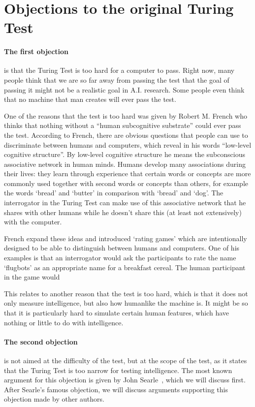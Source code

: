\section{Objections to the original Turing Test}

\cite{sep-turing-test,another}
\paragraph{The first objection} is that the Turing Test is too hard for a computer to pass. Right now, many people think that we are so far away from passing the test that the goal of passing it might not be a realistic goal in A.I. research. Some people even think that no machine that man creates will ever pass the test.

One of the reasons that the test is too hard was given by Robert M. French who thinks that nothing without a “human subcognitive substrate” could ever pass the test. According to French, there are obvious questions that people can use to discriminate between humans and computers, which reveal in his words “low-level cognitive structure”. By low-level cognitive structure he means the subconscious associative network in human minds. Humans develop many associations during their lives: they learn through experience that certain words or concepts are more commonly used together with second words or concepts than others, for example the words ‘bread’ and ‘butter’ in comparison with ‘bread’ and ‘dog’. The interrogator in the Turing Test can make use of this associative network that he shares with other humans while he doesn’t share this (at least not extensively) with the computer.

French expand these ideas and introduced ‘rating games’ which are intentionally designed to be able to distinguish between humans and computers. One of his examples is that an interrogator would ask the participants to rate the name ‘flugbots’ as an appropriate name for a breakfast cereal. The human participant in the game would

This relates to another reason that the test is too hard, which is that it does not only measure intelligence, but also how humanlike the machine is. It might be so that it is particularly hard to simulate certain human features, which have nothing or little to do with intelligence.


\paragraph{The second objection} is not aimed at the difficulty of the test, but at the scope of the test, as it states that the Turing Test is too narrow for testing intelligence. The most known argument for this objection is given by John Searle~\cite{searle1980minds}, which we will discuss first. After Searle’s famous objection, we will discuss arguments supporting this objection made by other authors.

